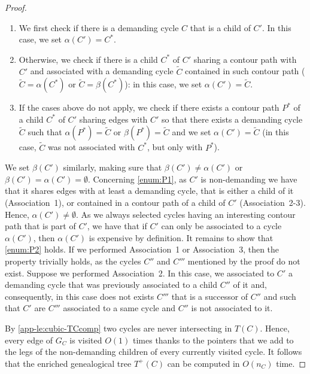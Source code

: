 \documentclass[runningheads]{llncs}
\begin{document}
\begin{proof}
\begin{enumerate}
\item We first check if there is a demanding cycle $C$ that is a child of $C'$.
In this case, we set $\alpha(C')=C^*$. 
\item Otherwise, we check if there is a child $C^*$ of $C'$ sharing a contour path with $C'$  and associated with a demanding cycle $\tilde{C}$ contained in such contour path ($\tilde{C}=\alpha(C^*)$ or $\tilde{C}=\beta(C^*)$): in this case, we set $\alpha(C')=\tilde{C}$.
\item If the cases above do not apply, we check if there exists a contour path $P^*$ of a child $C^*$ of $C'$ sharing edges with $C'$ so that there exists a demanding cycle $\tilde{C}$ such that $\alpha(P^*)= \tilde{C}$ or $\beta(P^*)=\tilde{C}$  and we set $\alpha(C')=\tilde{C}$ (in this case, $\tilde{C}$ was not associated with $C^*$, but only with $P^*$). 
\end{enumerate}


We set $\beta(C')$ similarly, making sure that $\beta(C')\not = \alpha(C')$ or $\beta(C')= \alpha(C')=\emptyset$. Concerning \ref{enum:P1}, as $C'$ is non-demanding we have that it shares edges with at least a demanding cycle, that is either a child of it (Association~1), or contained in a contour path of a child of $C'$ (Association~2-3). Hence, $\alpha(C')\not = \emptyset$. As we always selected cycles having an interesting contour path that is part of $C'$, we have that if $C'$ can only be associated to a cycle $\alpha(C')$, then $\alpha(C')$ is expensive by definition. It remains to show that  \ref{enum:P2} holds. If we performed Association~1 or Association~3, then the property trivially holds, as the cycles $C''$ and $C'''$ mentioned by the proof do not exist.
Suppose we performed Association~2. In this case, we associated to $C'$ a demanding cycle that was previously associated to a child $C''$ of it and, consequently, in this case does not exists $C'''$ that is a successor of $C''$ and such that $C'$ are $C'''$ associated to a same cycle and $C''$ is not associated to it.



By \cref{app-le:cubic-TCcomp} two cycles are never intersecting in $T(C)$. Hence, every edge of $G_C$ is visited $O(1)$ times thanks to the pointers that we add to the legs of the non-demanding children of every currently visited cycle. It follows that the enriched genealogical tree $T^+(C)$ can be computed in $O(n_C)$ time.
\end{proof}
\end{document}
